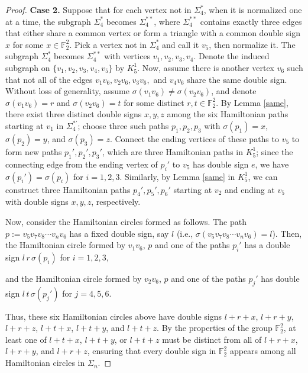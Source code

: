 \documentclass[12pt]{amsart}
\theoremstyle{plain}
\theoremstyle{definition}%
\begin{document}
\begin{proof}
\textbf{Case 2.} Suppose that for each vertex not in \(\Sigma_4^*\), when it is normalized one at a time,  
the subgraph \(\Sigma_4^*\) becomes \(\Sigma_4^{**}\), where \(\Sigma_4^{**}\) contains exactly three edges that either share a common vertex or form a triangle with a common double sign \(x\) for some \(x \in \mathbb{F}_2^2\).
 Pick a vertex not in \(\Sigma_4^*\) and call it \(v_5\), then normalize it. The subgraph \(\Sigma_4^*\) becomes \(\Sigma_4^{**}\) with vertices \(v_1,v_2,v_3,v_4\). Denote the induced subgraph on \(\{v_1,v_2,v_3,v_4,v_5\}\) by \(K_5^1\). Now, assume there is another vertex \(v_6\) such that not all of the edges \(v_1v_6, v_2v_6, v_3v_6,\) and \(v_4v_6\) share the same double sign. Without loss of generality, assume \(\sigma(v_1v_6) \neq \sigma(v_2v_6)\), and denote \(\sigma(v_1v_6)=r\) and \(\sigma(v_2v_6)=t\) for some distinct \(r,t\in \mathbb{F}_2^2\). By Lemma \ref{same}, there exist three distinct double signs \(x,y,z\) among the six Hamiltonian paths starting at \(v_1\) in $\Sigma_4^{*'}$; choose three such paths \(p_1,p_2,p_3\) with \(\sigma(p_1)=x\), \(\sigma(p_2)=y\), and \(\sigma(p_3)=z\). Connect the ending vertices  of these paths to \(v_5\) to form new paths \(p_1',p_2',p_3'\), which are three Hamiltonian paths in $K_5^1$; since the connecting edge from the ending vertex of $p_i'$ to \(v_5\) has double sign \(e\), we have \(\sigma(p_i') = \sigma(p_i)\) for \(i=1,2,3\). Similarly, by Lemma \ref{same} in $K_5^1$, we can construct three Hamiltonian paths \(p_4',p_5',p_6'\) starting at \(v_2\) and ending at \(v_5\) with double signs \(x,y,z\), respectively.



Now, consider the Hamiltonian circles formed as follows. The path \(p:=v_5v_7v_8\cdots v_nv_6\) has a fixed double sign, say \(l\) (i.e., \(\sigma(v_5v_7v_8\cdots v_nv_6)=l\)). Then, the Hamiltonian circle formed by \(v_1v_6\), $p$ and one of the paths \(p_i'\) has a double sign
 $l\,r\,\sigma(p_i)$ for $i=1,2,3$,

and the Hamiltonian circle formed by \(v_2v_6\), $p$ and one of the paths \(p_j'\) has double sign
 $l\,t\,\sigma(p_j')$ for $j=4,5,6$.

Thus, these six Hamiltonian circles above have double signs \(l+r+x\), \(l+r+y\), \(l+r+z\), \(l+t+x\), \(l+t+y\), and \(l+t+z\). By the properties of the group \(\mathbb{F}_2^2\), at least one of \(l+t+x\), \(l+t+y\), or \(l+t+z\) must be distinct from all of \(l+r+x\), \(l+r+y\), and \(l+r+z\), ensuring that every double sign in \(\mathbb{F}_2^2\) appears among all Hamiltonian circles in $\Sigma_n$.


\end{proof}
\end{document}
